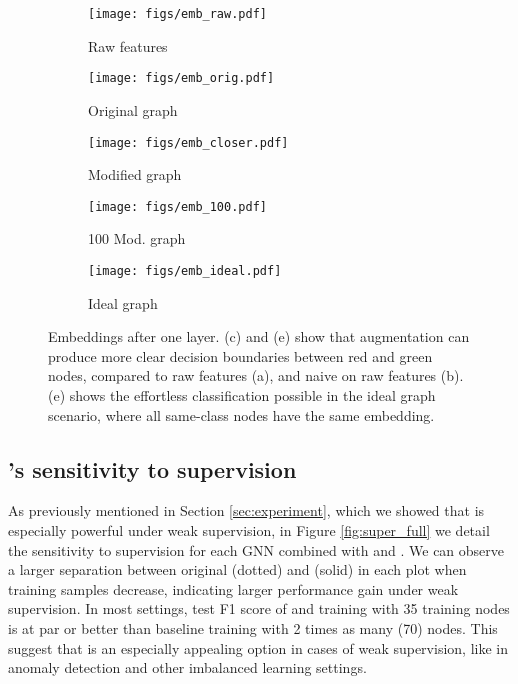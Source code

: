 \documentclass[letterpaper]{article} \usepackage{aaai21}  \usepackage{times}  \usepackage{helvet} \usepackage{courier}  \usepackage[hyphens]{url}  \usepackage{graphicx} \urlstyle{rm} \def\UrlFont{\rm}  \usepackage{natbib}  \usepackage{caption} \frenchspacing  \setlength{\pdfpagewidth}{8.5in}  \setlength{\pdfpageheight}{11in}
\begin{document}
\begin{figure*}[t!]
    \centering
        \begin{subfigure}[b]{.19\linewidth}
          \texttt{[image: figs/emb\_raw.pdf]}
            \caption{Raw features}\label{fig:emb_raw}
        \end{subfigure}
        \begin{subfigure}[b]{.19\linewidth}
          \texttt{[image: figs/emb\_orig.pdf]}
            \caption{Original graph}\label{fig:emb_orig}
        \end{subfigure}
        \begin{subfigure}[b]{.19\linewidth}
            \texttt{[image: figs/emb\_closer.pdf]}
            \caption{Modified graph}\label{fig:emb_mod}
        \end{subfigure}
        \begin{subfigure}[b]{.19\linewidth}
            \texttt{[image: figs/emb\_100.pdf]}
            \caption{100 Mod. graph }\label{fig:emb_100}
        \end{subfigure}
        \begin{subfigure}[b]{.19\linewidth}
            \texttt{[image: figs/emb\_ideal.pdf]}
            \caption{Ideal graph}\label{fig:emb_ideal}
        \end{subfigure}
    \caption{Embeddings after one \gcn layer. (c) and (e) show that augmentation can produce more clear decision boundaries between red and green nodes, compared to raw features (a), and naive \gcn on raw features (b).  (e) shows the effortless classification possible in the ideal graph scenario, where all same-class nodes have the same embedding.}\label{fig:emb}
\end{figure*}


\subsection{\methodshared's sensitivity to supervision}

As previously mentioned in Section \ref{sec:experiment},  which we showed that \methodshared is especially powerful under weak supervision, in Figure \ref{fig:super_full} we detail the sensitivity to supervision for each GNN combined with \methodtwo and \method. We can observe a larger separation between original (dotted) and \methodshared (solid) in each plot when training samples decrease, indicating larger performance gain under weak supervision. In most settings, test F1 score of \methodtwo and \methodshared training with 35 training nodes is at par or better than baseline training with 2 times as many (70) nodes. This suggest that \methodshared is an especially appealing option in cases of weak supervision, like in anomaly detection and other imbalanced learning settings.
\end{document}
